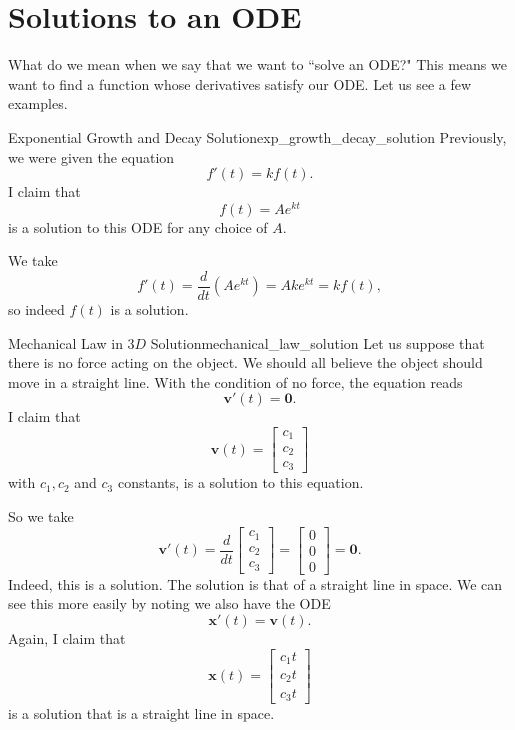         \section{Solutions to an ODE}
        
        What do we mean when we say that we want to ``solve an ODE?" This means we want to find a function whose derivatives satisfy our ODE.  Let us see a few examples.
        
        \begin{ex}{Exponential Growth and Decay Solution}{exp_growth_decay_solution}
        Previously, we were given the equation
        \[
        f'(t)=kf(t).
        \]
        I claim that 
        \[
        f(t)=Ae^{kt}
        \]
        is a solution to this ODE for any choice of $A$. 
        
        We take 
        \[
        f'(t)=\frac{d}{dt}(Ae^{kt})=Ake^{kt}=kf(t),
        \]
        so indeed $f(t)$ is a solution.
        \end{ex}
        
        \begin{ex}{Mechanical Law in $3D$ Solution}{mechanical_law_solution}
        Let us suppose that there is no force acting on the object.  We should all believe the object should move in a straight line.  With the condition of no force, the equation reads
        \[
        \mathbf{v}'(t)=\mathbf{0}.
        \]
        I claim that 
        \[
        \mathbf{v}(t)=\begin{bmatrix} c_1 \\ c_2 \\ c_3 \end{bmatrix}
        \]
        with $c_1, c_2$ and $c_3$ constants, is a solution to this equation. 
        
        So we take
        \[
        \mathbf{v}'(t)=\frac{d}{dt} \begin{bmatrix} c_1 \\ c_2 \\ c_3 \end{bmatrix} = \begin{bmatrix} 0 \\ 0 \\ 0 \end{bmatrix} = \mathbf{0}.
        \]
        Indeed, this is a solution.  The solution is that of a straight line in space.  We can see this more easily by noting we also have the ODE
        \[
        \mathbf{x}'(t) = \mathbf{v}(t).
        \]
        Again, I claim that
        \[
        \mathbf{x}(t) = \begin{bmatrix} c_1 t \\ c_2 t \\ c_3 t\end{bmatrix}
        \]
        is a solution that is a straight line in space.
        \end{ex}
        
